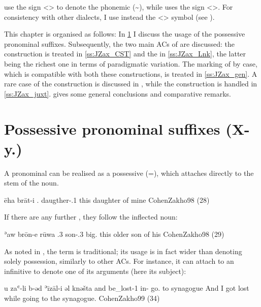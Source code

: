 \citet{CohenZakho, SabarDictionary} use the sign <> to denote the phonemic  (\phonetic[ə]\~\phonetic[ɪ]), while \citet{Avineri} uses the sign <>. For consistency with other dialects, I use instead the <>  symbol (see \pageref{ss:examples_format}). 

This chapter is organised as follows: In \ref{ss:JZax_Poss_Pro} I discuss the usage of the possessive pronominal suffixes. Subsequently, the two main ACs of \JZax are discussed: the  construction is treated in \ref{ss:JZax_CST} and the  in \ref{ss:JZax_Lnk}, the latter being the richest one in terms of paradigmatic variation. The marking of \secns by \gen* case, which is compatible with both these constructions, is treated in \ref{ss:JZax_gen}. A rare  case of the  construction is discussed in , while the  construction is handled in \ref{ss:JZax_juxt}.  gives some general conclusions and comparative remarks. 




\section{Possessive pronominal suffixes (X-y.\poss)} \label{ss:JZax_Poss_Pro}

A pronominal \secn can be realised as a possessive  (=\poss), which  attaches directly to the stem of the \prim noun. 

{ēha brāt-i}
{\dem.\fem{} daugther-\poss.1\sg}
{this daughter of mine}
{CohenZakho}{98 (28)}

If there are any further \secns, they follow the inflected noun:

{ʾaw brōn-e rūwa}
{.3\masc{} son-\poss.3\masc{} big.\masc}
{this older son of his}
{CohenZakho}{98 (29)}

As noted in , the term  is traditional;  its usage is in fact wider than denoting solely possession, similarly to other ACs. For instance, it can attach to an infinitive to denote one of its arguments (here its subject):

{u\cb{} zaʿ-li b-əd ʾīzāl-i əl knəšta}
{and\cb{} be\_lost-1\sg{} in-\cst{} go.\sg{} to synagogue}
{And I got lost while going to the synagogue.}
{CohenZakho}{99 (34)}

